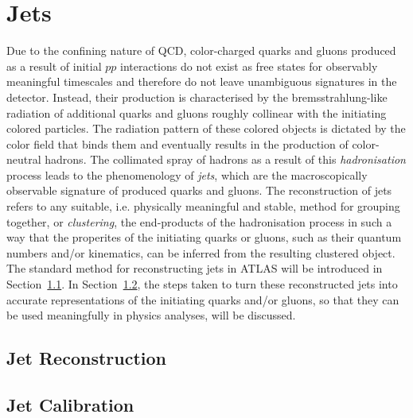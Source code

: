 \section{Jets}
\label{sec:jets}

Due to the confining nature of QCD, color-charged quarks and gluons produced as a result of
initial $pp$ interactions do not exist as free states for observably meaningful
timescales and therefore do not leave unambiguous signatures in the detector.
Instead, their production is characterised by the bremsstrahlung-like radiation of additional
quarks and gluons roughly collinear with the initiating colored particles.
The radiation pattern of these colored objects is dictated by the color field
that binds them and eventually results in the production of color-neutral hadrons.
The collimated spray of hadrons as a result of this \textit{hadronisation} process
leads to the phenomenology of \textit{jets}, which are the macroscopically observable signature
of produced quarks and gluons.
The reconstruction of jets refers to any suitable, i.e. physically meaningful and stable,
method for grouping together, or \textit{clustering}, the end-products of the hadronisation
process in such a way that the properites of the initiating quarks or gluons, such
as their quantum numbers and/or kinematics, can be inferred from the resulting clustered object.
The standard method for reconstructing jets in ATLAS will be introduced in Section~\ref{sec:jet_reco}.
In Section~\ref{sec:jet_calib}, the steps taken to turn these reconstructed jets into
accurate representations of the initiating quarks and/or gluons, so that they can
be used meaningfully in physics analyses, will be discussed.

\subsection{Jet Reconstruction}
\label{sec:jet_reco}

\subsection{Jet Calibration}
\label{sec:jet_calib}
